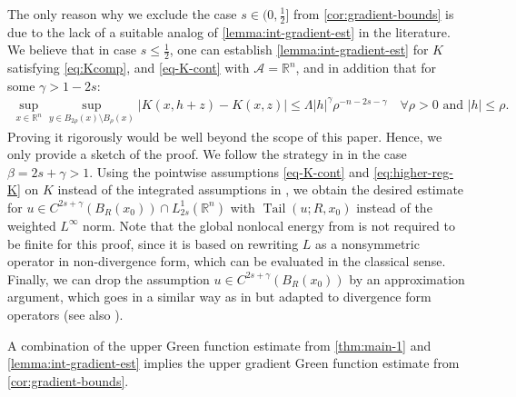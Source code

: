 \documentclass[11pt,reqno]{amsart}
\theoremstyle{plain}
\theoremstyle{definition}
\numberwithin{equation}{section}
\newcommand{\R}{\mathbb{R}}
\newcommand{\1}{\mathbbm{1}}
\DeclareMathOperator{\tail}{Tail}
\begin{document}
\begin{remark}
\label{remark:Green-gradient}
The only reason why we exclude the case $s \in (0,\frac{1}{2}]$ from \autoref{cor:gradient-bounds} is due to the lack of a suitable analog of \autoref{lemma:int-gradient-est} in the literature. We believe that in case $s \leq \frac{1}{2}$, one can establish \autoref{lemma:int-gradient-est} for $K$ satisfying \eqref{eq:Kcomp}, and \eqref{eq-K-cont} with $\mathcal{A} = \R^n$, and in addition that for some $\gamma>1-2s$:
\begin{align}
\label{eq:higher-reg-K}
    \sup_{x \in \R^n} \sup_{y \in B_{2\rho}(x) \setminus B_{\rho}(x)} |K(x,h+z) - K(x,z)| \le \Lambda |h|^{\gamma} \rho^{-n-2s-\gamma} \quad \forall \rho > 0 \text{ and }|h| \le \rho.
\end{align}
Proving it rigorously would be well beyond the scope of this paper. Hence, we only provide a sketch of the proof. We follow the strategy in \cite[Theorem 4.2]{FeRo24b} in the case $\beta = 2s + \gamma > 1$. Using the pointwise assumptions \eqref{eq-K-cont} and \eqref{eq:higher-reg-K} on $K$ instead of the integrated assumptions in \cite{FeRo24b}, we obtain the desired estimate for $u \in C^{2s + \gamma}(B_R(x_0)) \cap L^1_{2s}(\R^n)$ with $\tail(u;R,x_0)$ instead of the weighted $L^{\infty}$ norm. Note that the global nonlocal energy from \cite[Definition 4.1]{FeRo24b} is not required to be finite for this proof, since it is based on rewriting $L$ as a nonsymmetric operator in non-divergence form, which can be evaluated in the classical sense. Finally, we can drop the assumption $u \in C^{2s + \gamma}(B_R(x_0))$ by an approximation argument, which goes in a similar way as in \cite[Chapter 3.4.1]{FeRo24} but adapted to divergence form operators (see also \cite[Section 3]{Fer24}).
\end{remark}


A combination of the upper Green function estimate from \autoref{thm:main-1} and \autoref{lemma:int-gradient-est} implies the upper gradient Green function estimate from \autoref{cor:gradient-bounds}.
\end{document}
